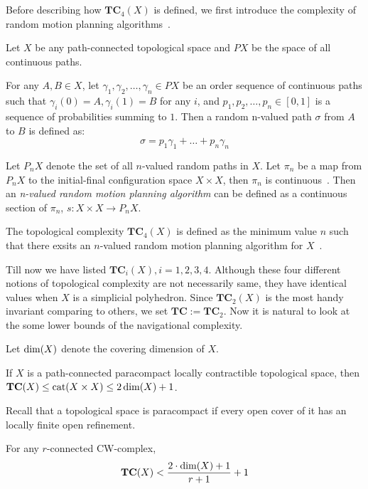 Before describing how \(\mathbf{TC}_4(X)\) is defined, we first introduce the complexity of random motion planning algorithms~\cite{farber2004collision}.

Let \(X\) be any path-connected topological space and \(PX\) be the space of all continuous paths.
\begin{definition}
  For any \(A,B\in X\), let \(\gamma_1,\gamma_2,\dots,\gamma_n\in PX\) be an order sequence of continuous paths such that \(\gamma_i(0)=A,\gamma_i(1)=B\) for any \(i\), and \(p_1,p_2,\dots,p_n\in [0,1]\) is a sequence of probabilities summing to \(1\). Then a random n-valued path \(\sigma\) from \(A\) to \(B\) is defined as:
  \[\sigma=p_1\gamma_1+\dots+p_n\gamma_n\]
\end{definition}

Let \(P_nX\) denote the set of all \(n\)-valued random paths in \(X\).
Let \(\pi_n\) be a map from \(P_nX\) to the initial-final configuration space \(X\times X\), then \(\pi_n\) is continuous~\cite{farber2004collision}.
Then an \emph{n-valued random motion planning algorithm} can be defined as a continuous section of \(\pi_n\), \(s:X\times X\to P_n X\).

\begin{definition}
  The topological complexity \(\mathbf{TC}_4(X)\) is defined as the minimum value \(n\) such that there exsits an \(n\)-valued random motion planning algorithm for \(X\)~\cite{farber2006topology}.
\end{definition}

Till now we have listed \(\mathbf{TC}_i(X),i=1,2,3,4\). Although these four different notions of topological complexity are not necessarily same, they have identical values when \(X\) is a simplicial polyhedron. Since \(\mathbf{TC}_2(X)\) is the most handy invariant comparing to others, we set \(\mathbf{TC}:=\mathbf{TC}_2\).
Now it is natural to look at the some lower bounds of the navigational complexity.

Let \(\operatorname{dim}(X)\) denote the covering dimension of \(X\).
\begin{theorem}
If \(X\) is a path-connected paracompact locally contractible topological space, then \(\mathbf{TC}(X)\le \operatorname{cat}(X\times X)\le 2\operatorname{dim}(X)+1\).
\end{theorem}
Recall that a topological space is paracompact if every open cover of it has an locally finite open refinement.
\begin{theorem}
  For any \(r\)-connected CW-complex,
  \[\mathbf{TC}(X)<\frac{2\cdot\operatorname{dim}(X)+1}{r+1}+1\]
\end{theorem}

